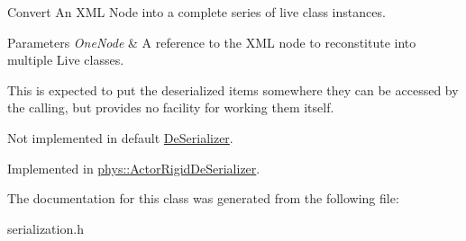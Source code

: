 Convert An XML Node into a complete series of live class instances. 


\begin{DoxyParams}{Parameters}
{\em OneNode} & A reference to the XML node to reconstitute into multiple Live classes.\\
\hline
\end{DoxyParams}
This is expected to put the deserialized items somewhere they can be accessed by the calling, but provides no facility for working them itself. \par
 \par
 Not implemented in default \hyperlink{classphys_1_1DeSerializer}{DeSerializer}. 

Implemented in \hyperlink{classphys_1_1ActorRigidDeSerializer_a63f7309025f18e8c7ca49f1bda7f8853}{phys::ActorRigidDeSerializer}.



The documentation for this class was generated from the following file:\begin{DoxyCompactItemize}
\item 
serialization.h\end{DoxyCompactItemize}
